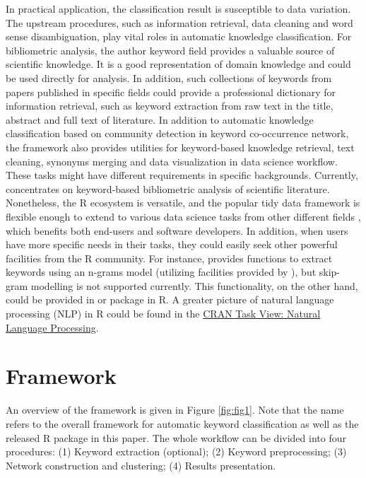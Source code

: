 In practical application, the classification result is susceptible to
data variation. The upstream procedures, such as information retrieval,
data cleaning and word sense disambiguation, play vital roles in
automatic knowledge classification. For bibliometric analysis, the
author keyword field provides a valuable source of scientific knowledge.
It is a good representation of domain knowledge and could be used
directly for analysis. In addition, such collections of keywords from
papers published in specific fields could provide a professional
dictionary for information retrieval, such as keyword extraction from
raw text in the title, abstract and full text of literature. In addition
to automatic knowledge classification based on community detection in
keyword co-occurrence network, the  framework also provides
utilities for keyword-based knowledge retrieval, text cleaning, synonyms
merging and data visualization in data science workflow. These tasks
might have different requirements in specific backgrounds. Currently,
 concentrates on keyword-based bibliometric analysis of
scientific literature. Nonetheless, the R ecosystem is versatile, and
the popular tidy data framework is flexible enough to extend to various
data science tasks from other different fields
\citep{wickham2014tidy, wickham2016r, Julia-3165010}, which benefits
both end-users and software developers. In addition, when users have
more specific needs in their tasks, they could easily seek other
powerful facilities from the R community. For instance, 
provides functions to extract keywords using an n-grams model (utilizing
facilities provided by ), but skip-gram modelling is
not supported currently. This functionality, on the other hand, could be
provided in  \citep{Mullen2018} or
 \citep{Benoit2018} package in R. A greater picture of
natural language processing (NLP) in R could be found in the
\href{https://cran.r-project.org/web/views/NaturalLanguageProcessing.html}{CRAN
Task View: Natural Language Processing}.

\hypertarget{framework}{%
\section{Framework}\label{framework}}

An overview of the framework is given in Figure \ref{fig:fig1}. Note
that the name  refers to the overall framework for
automatic keyword classification as well as the released R package in
this paper. The whole workflow can be divided into four procedures: (1)
Keyword extraction (optional); (2) Keyword preprocessing; (3) Network
construction and clustering; (4) Results presentation.


